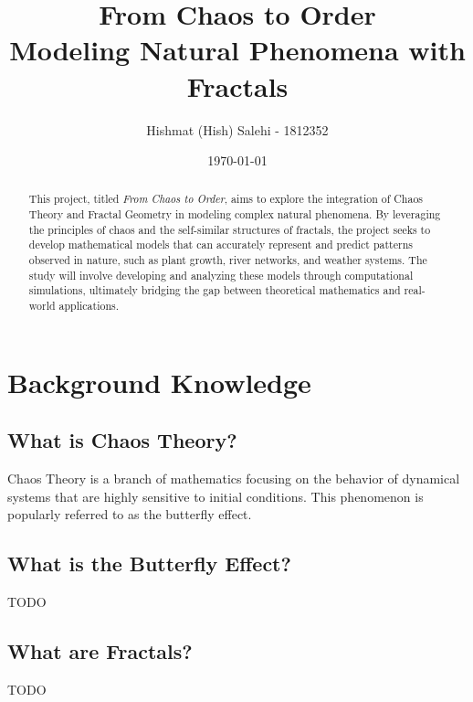 \documentclass[12pt]{article}
\title{From Chaos to Order\\
       \large Modeling Natural Phenomena with Fractals}
\author{Hishmat (Hish) Salehi - 1812352}
\date{\today}
\begin{document}
\maketitle

\begin{abstract}
This project, titled \textit{From Chaos to Order}, aims to explore the integration of Chaos Theory and Fractal Geometry in modeling complex natural phenomena. By leveraging the principles of chaos and the self-similar structures of fractals, the project seeks to develop mathematical models that can accurately represent and predict patterns observed in nature, such as plant growth, river networks, and weather systems. The study will involve developing and analyzing these models through computational simulations, ultimately bridging the gap between theoretical mathematics and real-world applications.
\end{abstract}

\tableofcontents

\section{Background Knowledge}

\subsection{What is Chaos Theory?}
Chaos Theory is a branch of mathematics focusing on the behavior of dynamical systems that are highly sensitive to initial conditions. This phenomenon is popularly referred to as the butterfly effect.

\subsection{What is the Butterfly Effect?}
TODO

\subsection{What are Fractals?}
TODO
\end{document}
